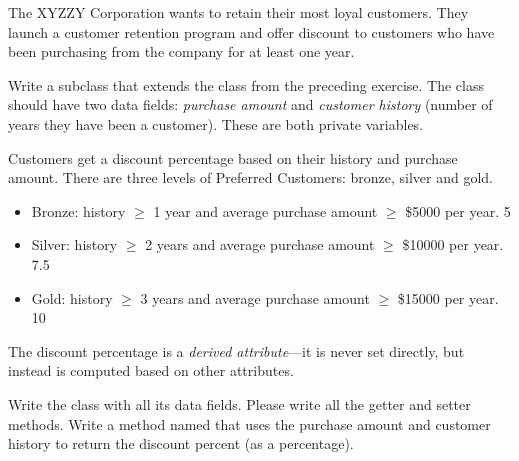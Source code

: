 \begin{exercise}
The XYZZY Corporation wants to retain their most loyal customers. They launch a customer retention program and offer discount to customers who have been purchasing from the company for at least one year.

Write a subclass  that extends the  class from the preceding exercise. The  class should have two data fields: {\em purchase amount} and {\em customer history} (number of years they have been a customer). These are both private variables.

Customers get a discount percentage based on their history and purchase amount. There are three levels of Preferred Customers: bronze, silver and gold.

\begin{itemize}
\item Bronze: history $\geq$ 1 year and average purchase amount $\geq$ \$5000 per year.  5%
\item Silver:  history $\geq$ 2 years and average purchase amount $\geq$ \$10000 per year. 7.5%
\item Gold:  history $\geq$ 3 years and average purchase amount $\geq$ \$15000 per year. 10%
\end{itemize}

The discount percentage is a {\em derived attribute}---it is never set directly, but instead is computed based on other attributes.

Write the  class with all its data fields. Please write all the getter and setter methods.  Write a method named  that uses the purchase amount and customer history to return the discount percent (as a percentage).
\end{exercise}




